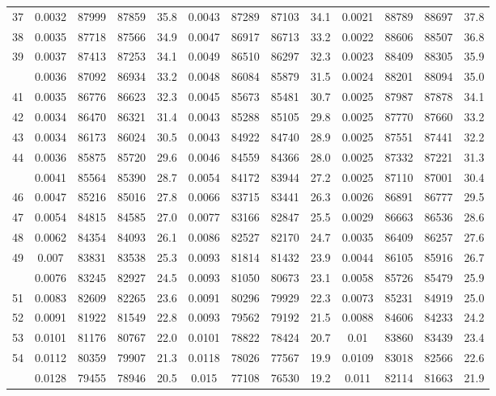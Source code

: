 \documentclass[
  14pt,
]{article}
\begin{document}
\begin{longtable}[t]{lcccccccccccc}
37 & 0.0032 & 87999 & 87859 & 35.8 & 0.0043 & 87289 & 87103 & 34.1 & 0.0021 & 88789 & 88697 & 37.8\\
38 & 0.0035 & 87718 & 87566 & 34.9 & 0.0047 & 86917 & 86713 & 33.2 & 0.0022 & 88606 & 88507 & 36.8\\
39 & 0.0037 & 87413 & 87253 & 34.1 & 0.0049 & 86510 & 86297 & 32.3 & 0.0023 & 88409 & 88305 & 35.9\\
\addlinespace
40 & 0.0036 & 87092 & 86934 & 33.2 & 0.0048 & 86084 & 85879 & 31.5 & 0.0024 & 88201 & 88094 & 35.0\\
41 & 0.0035 & 86776 & 86623 & 32.3 & 0.0045 & 85673 & 85481 & 30.7 & 0.0025 & 87987 & 87878 & 34.1\\
42 & 0.0034 & 86470 & 86321 & 31.4 & 0.0043 & 85288 & 85105 & 29.8 & 0.0025 & 87770 & 87660 & 33.2\\
43 & 0.0034 & 86173 & 86024 & 30.5 & 0.0043 & 84922 & 84740 & 28.9 & 0.0025 & 87551 & 87441 & 32.2\\
44 & 0.0036 & 85875 & 85720 & 29.6 & 0.0046 & 84559 & 84366 & 28.0 & 0.0025 & 87332 & 87221 & 31.3\\
\addlinespace
45 & 0.0041 & 85564 & 85390 & 28.7 & 0.0054 & 84172 & 83944 & 27.2 & 0.0025 & 87110 & 87001 & 30.4\\
46 & 0.0047 & 85216 & 85016 & 27.8 & 0.0066 & 83715 & 83441 & 26.3 & 0.0026 & 86891 & 86777 & 29.5\\
47 & 0.0054 & 84815 & 84585 & 27.0 & 0.0077 & 83166 & 82847 & 25.5 & 0.0029 & 86663 & 86536 & 28.6\\
48 & 0.0062 & 84354 & 84093 & 26.1 & 0.0086 & 82527 & 82170 & 24.7 & 0.0035 & 86409 & 86257 & 27.6\\
49 & 0.007 & 83831 & 83538 & 25.3 & 0.0093 & 81814 & 81432 & 23.9 & 0.0044 & 86105 & 85916 & 26.7\\
\addlinespace
50 & 0.0076 & 83245 & 82927 & 24.5 & 0.0093 & 81050 & 80673 & 23.1 & 0.0058 & 85726 & 85479 & 25.9\\
51 & 0.0083 & 82609 & 82265 & 23.6 & 0.0091 & 80296 & 79929 & 22.3 & 0.0073 & 85231 & 84919 & 25.0\\
52 & 0.0091 & 81922 & 81549 & 22.8 & 0.0093 & 79562 & 79192 & 21.5 & 0.0088 & 84606 & 84233 & 24.2\\
53 & 0.0101 & 81176 & 80767 & 22.0 & 0.0101 & 78822 & 78424 & 20.7 & 0.01 & 83860 & 83439 & 23.4\\
54 & 0.0112 & 80359 & 79907 & 21.3 & 0.0118 & 78026 & 77567 & 19.9 & 0.0109 & 83018 & 82566 & 22.6\\
\addlinespace
55 & 0.0128 & 79455 & 78946 & 20.5 & 0.015 & 77108 & 76530 & 19.2 & 0.011 & 82114 & 81663 & 21.9\\

\end{longtable}
\end{document}

